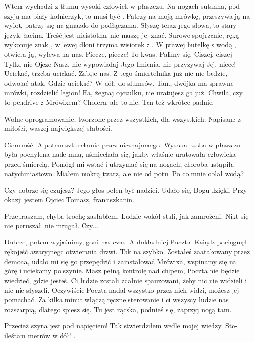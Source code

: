 Wtem wychodzi z tłumu wysoki człowiek w płaszczu.
Na nogach sutanna, pod szyją ma biały kołnierzyk, to musi być \censor{}.
Patrzy na moją mrówkę, przeszywa ją na wylot, patrzy się na gniazdo do podłączania.
Słyszę teraz jego słowa, to stary język, łacina. Treść jest nieistotna, nie muszę jej znać.
Surowe spojrzenie, ręką wykonuje znak \censor{}, w lewej dłoni trzyma wisiorek z \censor{}.
W prawej butelkę z wodą \censor{}, otwiera ją, wylewa na nas.
Piecze, piecze! To kwas. Palimy się. 
Ciszej, ciszej! Tylko nie Ojcze Nasz, nie wypowiadaj Jego Imienia, nie przyzywaj Jej, nieee!
Uciekać, trzeba uciekać. Zabije nas. Z tego śmiertelnika już nic nie będzie, odwołać atak.
Gdzie uciekać? W dół, do slumsów. Tam, dwójka ma sprawne mrówki, rozdzielić legion!
Ha, żegnaj ojczulku, nie uratujesz go już. Chwila, czy to pendrive z Mrówixem? Cholera, ale to nic. Ten też wkrótce padnie.

\ds{} Wolne oprogramowanie, tworzone przez wszystkich, dla wszystkich. Napisane z miłości, waszej największej słabości. \de{}

Ciemność. A potem szturchanie przez nieznajomego.
Wysoka osoba w płaszczu była pochylona nade mną, uśmiechała się, jakby właśnie uratowała człowieka przed śmiercią.
Pomógł mi wstać i utrzymać się na nogach, choroba ustąpiła natychmiastowo.
Miałem mokrą twarz, ale nie od potu. Po co mnie oblał wodą?

\ds{} Czy dobrze się czujesz? \dm{} Jego głos pełen był nadziei. \dm{} Udało się, Bogu dzięki. Przy okazji jestem Ojciec Tomasz, franciszkanin. \de{}

\ds{} Przepraszam, chyba trochę zasłabłem. \dm{} Ludzie wokół stali, jak zamrożeni. Nikt się nie poruszał, nie mrugał. \dm{}
Czy... \de{}

\ds{} Dobrze, potem wyjaśnimy, goni nas czas. A dokładniej Poczta. \dm{} Ksiądz pociągnął rękojeść awaryjnego otwierania drzwi.
\dm{} Tak na szybko. Zostałeś zaatakowany przez demona, udało mi się go przepędzić i zainstalować Mrówixa, wspinamy się na górę i uciekamy po szynie.
Masz pełną kontrolę nad chipem, Poczta nie będzie wiedzieć, gdzie jesteś.
Ci ludzie zostali zdalnie spauzowani, żeby nic nie widzieli i nic nie słyszeli. Oczywiście Poczta nadal wszystko przez nich widzi, możesz jej pomachać.
Za kilka minut włączą ręczne sterowanie i ci wszyscy ludzie nas rozszarpią, dlatego spiesz się. Tu jest rączka, podnieś się, zaprzyj nogą tam.\de{}

\ds{} Przecież szyna jest pod napięciem! \dm{} Tak stwierdziłem wedle mojej wiedzy. \dm{} Sto-ileśtam metrów w dół! \de{}.

